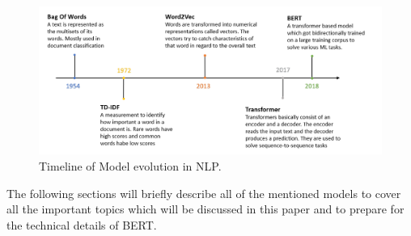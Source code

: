 \begin{figure}[H]
	\centering
	\includegraphics[width=1\textwidth]{figures/timeline_NLP.PNG}
	\caption{Timeline of Model evolution in NLP.}
	\label{fig:timeline}
\end{figure}

The following sections will briefly describe all of the mentioned models to cover all the important topics which will be discussed in this paper and to prepare for the technical details of BERT.

